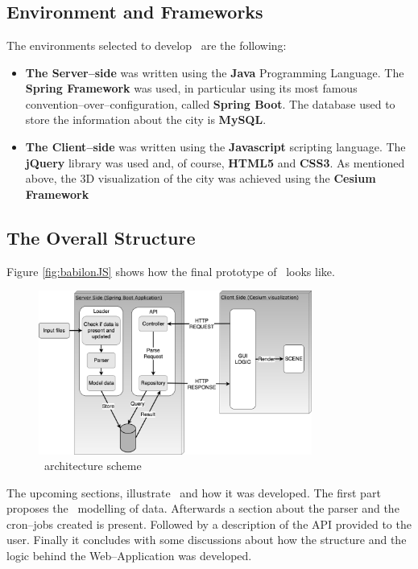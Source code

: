 \section{\applicationName} \label{projectDesign}
\subsection{Environment and Frameworks}
The environments selected to develop \applicationName\ are the following:
\begin{itemize}
	\item {\bf The Server--side} was written using the {\bf Java} Programming Language. The {\bf Spring Framework} was used, in particular using its most famous convention--over--configuration, called {\bf Spring Boot}. The database used to store the information about the city is {\bf MySQL}.
	\item {\bf The Client--side} was written using the {\bf Javascript} scripting language. The {\bf jQuery} library was used and, of course, {\bf HTML5} and {\bf CSS3}. As mentioned above, the 3D visualization of the city was achieved using the {\bf Cesium Framework}
\end{itemize}

\subsection{The Overall Structure}
Figure \ref{fig:babilonJS} shows how the final prototype of \applicationName\ looks like.
\begin{figure}[H]
\centering
\includegraphics[width=0.8\textwidth]{chapter3/images/project_structure}
\caption{\applicationName\ architecture scheme}
\label{fig:project_structure}
\end{figure}
The upcoming sections, illustrate \applicationName\ and how it was developed. The first part proposes the \applicationName\ modelling of data. Afterwards a section about the parser and the cron--jobs created is present. Followed by a description of the API provided to the user. Finally it concludes with some discussions about how the structure and the logic behind the Web--Application was developed.
